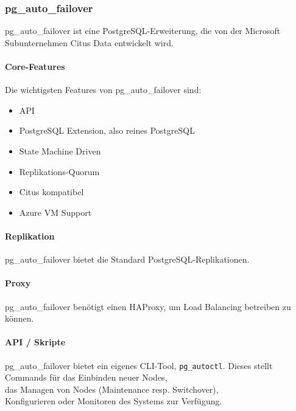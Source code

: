 
\begin{flushleft}
    \subsubsection{pg\_auto\_failover}
    pg\_auto\_failover ist eine PostgreSQL-Erweiterung, die von der Microsoft Subunternehmen Citus Data entwickelt wird.
\end{flushleft}
\begin{flushleft}
    \paragraph{Core-Features}
    Die wichtigsten Features von pg\_auto\_failover sind:
    \begin{itemize}
        \item API
        \item PostgreSQL Extension, also reines PostgreSQL
        \item State Machine Driven
        \item Replikations-Quorum
        \item Citus kompatibel
        \item Azure VM Support
    \end{itemize}
\end{flushleft}
\begin{flushleft}
    \paragraph{Replikation}
    pg\_auto\_failover bietet die Standard PostgreSQL-Replikationen.
\end{flushleft}
\begin{flushleft}
    \paragraph{Proxy}
    pg\_auto\_failover benötigt einen \Gls{HAProxy}, um Load Balancing betreiben zu können\cite{VYXTI7BS}.
\end{flushleft}
\begin{flushleft}
    \paragraph{API / Skripte}
    pg\_auto\_failover bietet ein eigenes CLI-Tool, \texttt{pg\_autoctl}.
    Dieses stellt Commands für das Einbinden neuer Nodes,\\
    das Managen von Nodes (Maintenance resp. Switchover),\\
    Konfigurieren oder Monitoren des Systems zur Verfügung\cite{4X2AKDB6}.
\end{flushleft}
